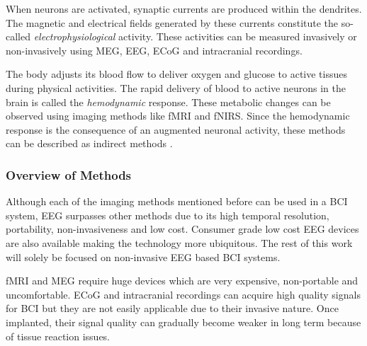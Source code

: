 \documentclass[12pt]{article}
\newcommand\mysubsubsection[1]{\subsubsection{#1}}
\numberwithin{equation}{section}
\numberwithin{figure}{section}
\numberwithin{table}{section}
\begin{document}
\par{
    When neurons are activated, synaptic currents are produced within the dendrites.
    The magnetic and electrical fields generated by these currents constitute the
    so-called \emph{electrophysiological} activity. These activities can be measured
    invasively or non-invasively using MEG, EEG, ECoG and intracranial recordings.
}
\par{
    The body adjusts its blood flow to deliver oxygen and glucose to active tissues
    during physical activities. The rapid delivery of blood to active neurons in
    the brain is called the \emph{hemodynamic} response. These metabolic changes
    can be observed using imaging methods like fMRI and fNIRS. Since
    the hemodynamic response is the consequence of an augmented neuronal activity,
    these methods can be described as indirect methods \citep{nicolas-alonso_brain_2012}.
}
\mysubsubsection{Overview of Methods}\label{seq:imaging_summary}
\par{
    Although each of the imaging methods mentioned before can be used in a BCI system,
    EEG surpasses other methods due to its high temporal resolution, portability,
    non-invasiveness and low cost. Consumer grade low cost EEG devices are also
    available making the technology more ubiquitous. The rest of this work will solely be focused on non-invasive EEG based BCI systems.
}
\par{
    fMRI and MEG require huge devices which are very expensive, non-portable and uncomfortable.
    ECoG and intracranial recordings can acquire high quality signals for BCI but they are not easily
    applicable due to their invasive nature. Once implanted, their signal quality
    can gradually become weaker in long term because of tissue reaction issues.
}
\end{document}
